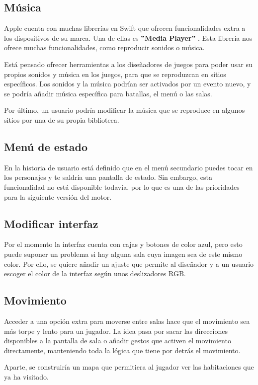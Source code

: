\subsection{Música}
Apple cuenta con muchas librerías en Swift que ofrecen funcionalidades extra a los dispositivos de su marca. Una de ellas es \textbf{''Media Player''} \cite{mediaPlayer}.
Esta librería nos ofrece muchas funcionalidades, como reproducir sonidos o música.

Está pensado ofrecer herramientas a los diseñadores de juegos para poder usar su propios sonidos y música en los juegos, para que se reproduzcan en sitios específicos. Los sonidos y la música podrían ser activados por un evento nuevo, y se podría añadir música específica para batallas, el menú o las salas.

Por último, un usuario podría modificar la música que se reproduce en algunos sitios por una de su propia biblioteca.

\subsection{Menú de estado}
En la historia de usuario está definido que en el menú secundario puedes tocar en los personajes y te saldría una pantalla de estado. Sin embargo, esta funcionalidad no está disponible todavía, por lo que es una de las prioridades para la siguiente versión del motor.

\subsection{Modificar interfaz}
Por el momento la interfaz cuenta con cajas y botones de color azul, pero esto puede suponer un problema si hay alguna sala cuya imagen sea de este mismo color. Por ello, se quiere añadir un ajuste que permite al diseñador y a un usuario escoger el color de la interfaz según unos deslizadores RGB.

\subsection{Movimiento}
Acceder a una opción extra para moverse entre salas hace que el movimiento sea más torpe y lento para un jugador. La idea pasa por sacar las direcciones disponibles a la pantalla de sala o añadir gestos que activen el movimiento directamente, manteniendo toda la lógica que tiene por detrás el movimiento.

Aparte, se construiría un mapa que permitiera al jugador ver las habitaciones que ya ha visitado.

